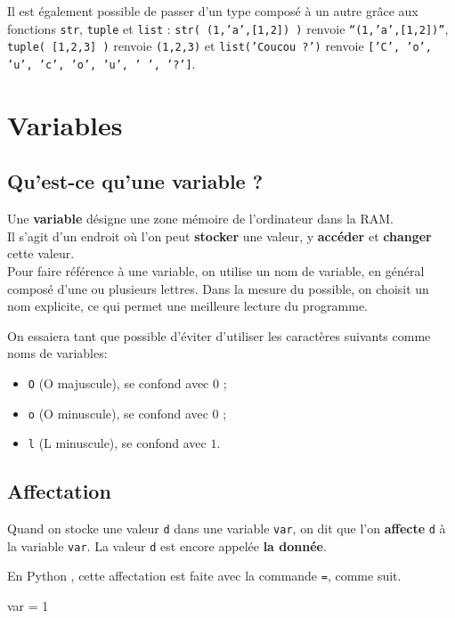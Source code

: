 Il est également possible de passer d'un type composé à un autre grâce aux fonctions \texttt{str}, 
\texttt{tuple} et \texttt{list} : \texttt{str( (1,'a',[1,2]) )} renvoie \texttt{``(1,'a',[1,2])''}, 
\texttt{tuple( [1,2,3] )} renvoie \texttt{(1,2,3)} et \texttt{list('Coucou ?')} renvoie 
\texttt{['C', 'o', 'u', 'c', 'o', 'u', ' ', '?']}.


\section{Variables}

\subsection{Qu'est-ce qu'une variable ?}

Une \textbf{variable} désigne une zone mémoire de l'ordinateur dans la RAM.\\
Il s'agit d'un endroit où l'on peut \textbf{stocker} une valeur, y \textbf{accéder} et 
\textbf{changer} cette valeur.\\

Pour faire référence à une variable, on utilise un nom de variable, en général composé d'une ou 
plusieurs lettres. Dans la mesure du possible, on choisit un nom explicite, ce qui permet une 
meilleure lecture du programme.

On essaiera tant que possible d'éviter d'utiliser les caractères suivants comme noms de variables:
\begin{itemize}
  \item \texttt{O} (O majuscule), se confond avec $0$ ;
  \item \texttt{o} (O minuscule), se confond avec $0$ ;
  \item \texttt{l} (L minuscule), se confond avec $1$. 
\end{itemize}


\subsection{Affectation}

Quand on stocke une valeur \texttt{d} dans une variable \texttt{var}, on dit que l'on 
\textbf{affecte} \texttt{d} à la variable \texttt{var}. La valeur
\texttt{d} est encore appelée \textbf{la donnée}.

En Python , cette affectation est faite avec la commande \texttt{=}, comme suit.  

\begin{pyconsole}
var  = 1
\end{pyconsole}



